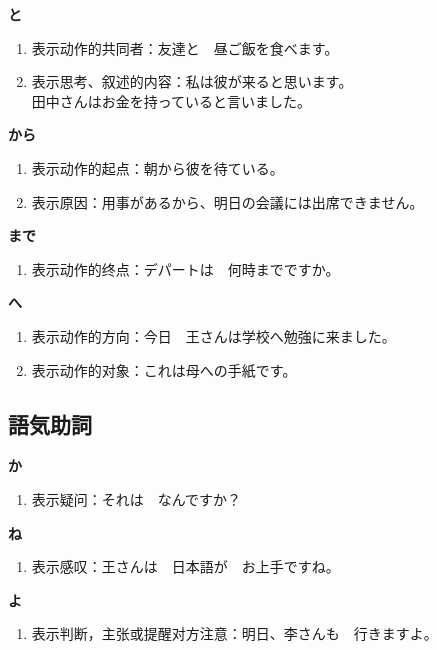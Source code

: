 {\bf
\noindent と
}

\begin{enumerate}
  \item 表示动作的共同者：友達と　昼ご飯を食べます。
  \item 表示思考、叙述的内容：私は彼が来ると思います。\\
    田中さんはお金を持っていると言いました。
\end{enumerate}

{\bf
\noindent から
}

\begin{enumerate}
  \item 表示动作的起点：朝から彼を待ている。
  \item 表示原因：用事があるから、明日の会議には出席できません。
\end{enumerate}

{\bf
\noindent まで
}

\begin{enumerate}
  \item 表示动作的终点：デパートは　何時までですか。
\end{enumerate}

{\bf
\noindent へ
}

\begin{enumerate}
  \item 表示动作的方向：今日　王さんは学校へ勉強に来ました。
  \item 表示动作的对象：これは母への手紙です。
\end{enumerate}



\subsection{語気助詞}%

{\bf
\noindent か
}

\begin{enumerate}
  \item 表示疑问：それは　なんですか？
\end{enumerate}

{\bf
\noindent ね
}

\begin{enumerate}
  \item 表示感叹：王さんは　日本語が　お上手ですね。
\end{enumerate}

{\bf
\noindent よ
}

\begin{enumerate}
  \item 表示判断，主张或提醒对方注意：明日、李さんも　行きますよ。
\end{enumerate}

